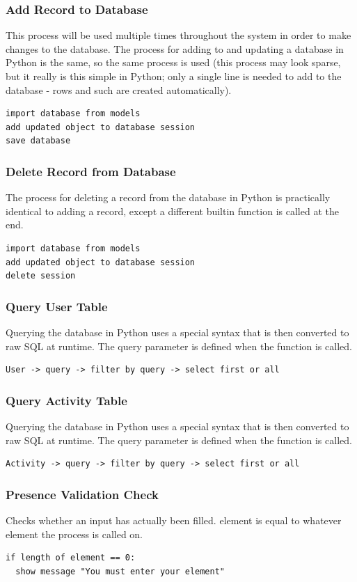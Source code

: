 \documentclass{article}[12pt,a4paper]
\begin{document}
\subsubsection{Add Record to Database}
This process will be used multiple times throughout the system in order to make changes to the database. The process for adding to and updating a database in Python is the same, so the same process is used (this process may look sparse, but it really is this simple in Python; only a single line is needed to add to the database - rows and such are created automatically).
\begin{verbatim}
import database from models
add updated object to database session
save database
\end{verbatim}

\subsubsection{Delete Record from Database}
The process for deleting a record from the database in Python is practically identical to adding a record, except a different builtin function is called at the end.
\begin{verbatim}
import database from models
add updated object to database session
delete session
\end{verbatim}

\subsubsection{Query User Table}
Querying the database in Python uses a special syntax that is then converted to raw SQL at runtime. The query parameter is defined when the function is called.
\begin{verbatim}
User -> query -> filter by query -> select first or all
\end{verbatim}

\subsubsection{Query Activity Table}
Querying the database in Python uses a special syntax that is then converted to raw SQL at runtime. The query parameter is defined when the function is called.
\begin{verbatim}
Activity -> query -> filter by query -> select first or all
\end{verbatim}

\subsubsection{Presence Validation Check}
Checks whether an input has actually been filled. element is equal to whatever element the process is called on.
\begin{verbatim}
if length of element == 0:
  show message "You must enter your element"
\end{verbatim}
\end{document}
